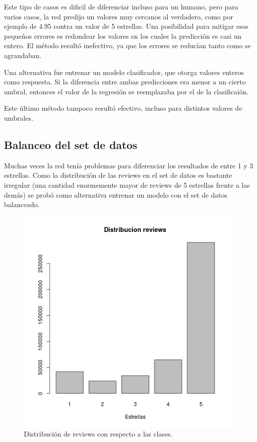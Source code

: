 Este tipo de casos es dificil de diferenciar incluso para un humano, pero para varios casos, la red
predijo un valores muy cercanos al verdadero, como por ejemplo de 4.95 contra un valor de 5
estrellas. Una posibilidad para mitigar esos peque\~nos errores es redondear los valores en los
cuales la predicci\'on es casi un entero. El m\'etodo result\'o inefectivo, ya que los errores se
reduc\'ian tanto como se agrandaban.

Una alternativa fue entrenar un modelo clasificador, que otorga valores enteros como respuesta.
Si la diferencia entre ambas predicciones era menor a un cierto umbral, entonces el valor de la
regresi\'on se reemplazaba por el de la clasificai\'on.

Este \'ultimo m\'etodo tampoco result\'o efectivo, incluso para distintos valores de umbrales.


\subsection{Balanceo del set de datos}

Muchas veces la red ten\'ia problemas para diferenciar los resultados de entre 1 y 3 estrellas.
Como la distribuci\'on de las reviews en el set de datos es bastante irregular (una cantidad
enormemente mayor de reviews de 5 estrellas frente a las dem\'as) se prob\'o como alternativa
entrenar un modelo con el set de datos balanceado.

\begin{figure}[h]
\centering
\includegraphics[width=1\linewidth]{Figures/dist_reviews.png}
\decoRule
\caption[Distribuci\'on de reviews]{Distribuci\'on de reviews con respecto a las clases.}
\label{fig:distribucion_reviews}
\end{figure}

